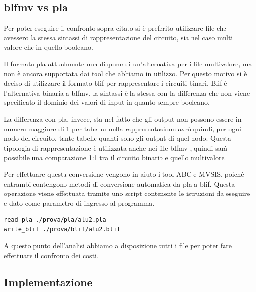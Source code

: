 \documentclass[
]{book}
\begin{document}
\newpage

\hypertarget{blfmv-vs-pla}{%
\subsection{blfmv vs pla}\label{blfmv-vs-pla}}

Per poter eseguire il confronto sopra citato si è preferito utilizzare file che avessero la stessa sintassi di rappresentazione del circuito, sia nel caso multi valore che in quello booleano.

Il formato pla attualmente non dispone di un'alternativa per i file multivalore, ma non è ancora supportata dai tool che abbiamo in utilizzo. Per questo motivo si è deciso di utilizzare il formato blif per rappresentare i circuiti binari. Blif è l'alternativa binaria a blfmv, la sintassi è la stessa con la differenza che non viene specificato il dominio dei valori di input in quanto sempre booleano.

La differenza con pla, invece, sta nel fatto che gli output non possono essere in numero maggiore di 1 per tabella: nella rappresentazione avrò quindi, per ogni nodo del circuito, tante tabelle quanti sono gli output di quel nodo. Questa tipologia di rappresentazione è utilizzata anche nei file blfmv , quindi sarà possibile una comparazione 1:1 tra il circuito binario e quello multivalore.

Per effettuare questa conversione vengono in aiuto i tool ABC e MVSIS, poiché entrambi contengono metodi di conversione automatica da pla a blif. Questa operazione viene effettuata tramite uno script contenente le istruzioni da eseguire e dato come parametro di ingresso al programma. \citep{kukimoto1996blif}

\begin{verbatim}
read_pla ./prova/pla/alu2.pla
write_blif ./prova/blif/alu2.blif
\end{verbatim}

A questo punto dell'analisi abbiamo a disposizione tutti i file per poter fare effettuare il confronto dei costi.

\newpage

\hypertarget{implementazione}{%
\subsection{Implementazione}\label{implementazione}}
\end{document}
